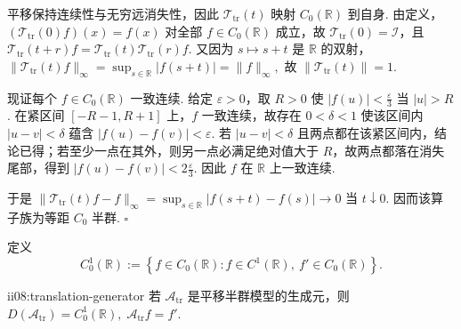 \begin{FAProof}
平移保持连续性与无穷远消失性，因此 \(\displaystyle\mathcal T_{\mathrm{tr}}(t)\) 映射 \(\displaystyle C_0(\mathbb R)\) 到自身. 由定义，\(\displaystyle(\mathcal T_{\mathrm{tr}}(0)f)(x)=f(x)\) 对全部 \(\displaystyle f\in C_0(\mathbb R)\) 成立，故 \(\displaystyle\mathcal T_{\mathrm{tr}}(0)=\mathcal I\)，且
\(\displaystyle \mathcal T_{\mathrm{tr}}(t+r)f = \mathcal T_{\mathrm{tr}}(t)\mathcal T_{\mathrm{tr}}(r)f.\)
又因为 \(\displaystyle s\mapsto s+t\) 是 \(\displaystyle\mathbb R\) 的双射，
\(\displaystyle \|\mathcal T_{\mathrm{tr}}(t)f\|_\infty = \sup_{s\in\mathbb R}|f(s+t)| = \|f\|_\infty,\)
故 \(\displaystyle\|\mathcal T_{\mathrm{tr}}(t)\|=1\).

现证每个 \(\displaystyle f\in C_0(\mathbb R)\) 一致连续. 给定 \(\displaystyle\varepsilon>0\)，取 \(\displaystyle R>0\) 使 \(\displaystyle|f(u)|<\frac{\varepsilon}{3}\) 当 \(\displaystyle|u|>R\). 在紧区间 \(\displaystyle[-R-1,R+1]\) 上，\(\displaystyle f\) 一致连续，故存在 \(\displaystyle0<\delta<1\) 使该区间内 \(\displaystyle|u-v|<\delta\) 蕴含 \(\displaystyle|f(u)-f(v)|<\varepsilon\). 若 \(\displaystyle|u-v|<\delta\) 且两点都在该紧区间内，结论已得；若至少一点在其外，则另一点必满足绝对值大于 \(\displaystyle R\)，故两点都落在消失尾部，得到 \(\displaystyle|f(u)-f(v)|<2\frac{\varepsilon}{3}\). 因此 \(\displaystyle f\) 在 \(\displaystyle\mathbb R\) 上一致连续.

于是
\(\displaystyle \|\mathcal T_{\mathrm{tr}}(t)f-f\|_\infty = \sup_{s\in\mathbb R}|f(s+t)-f(s)| \longrightarrow0\)
当 \(\displaystyle t\downarrow0\). 因而该算子族为等距 \(\displaystyle C_0\) 半群.
\hfill\(\square\)
\end{FAProof}

定义
\[
C_0^1(\mathbb R)
:=
\left\{
 f\in C_0(\mathbb R):
 f\in C^1(\mathbb R),\ f'\in C_0(\mathbb R)
\right\}.
\]

\begin{FAProposition}[B][平移半群生成元的精确定义域]{ii08:translation-generator}
若 \(\displaystyle\mathcal A_{\mathrm{tr}}\) 是平移半群模型的生成元，则
\(\displaystyle D(\mathcal A_{\mathrm{tr}}) = C_0^1(\mathbb R), \; \mathcal A_{\mathrm{tr}}f=f'.\)
\end{FAProposition}

